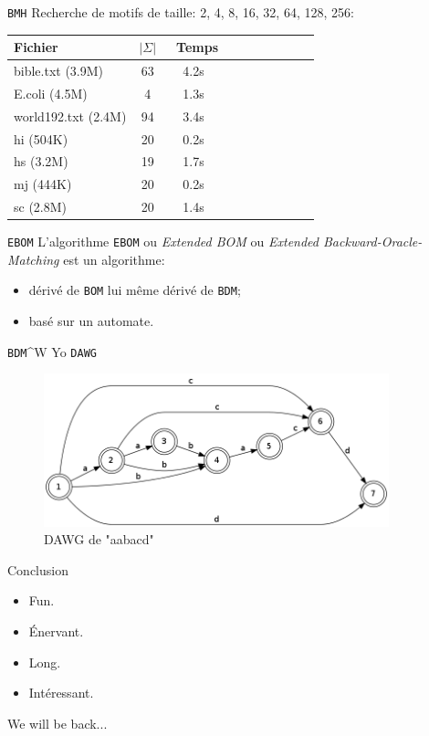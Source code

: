\documentclass[handout]{beamer}
\begin{document}
\begin{frame}{\texttt{BMH}}
  Recherche de motifs de taille: 2, 4, 8, 16, 32, 64, 128, 256:
  
  \begin{tabular}{|l|c|c|c|c|c|c|c|c|c|}
    \hline
    Fichier             & $ | \Sigma | $ & ~Temps \\
    \hline

    bible.txt (3.9M)    & 63 & 4.2s \\    
    E.coli (4.5M)       & 4  & 1.3s \\
    world192.txt (2.4M) & 94 & 3.4s \\
    hi (504K)           & 20 & 0.2s \\
    hs (3.2M)           & 19 & 1.7s \\
    mj (444K)           & 20 & 0.2s \\
    sc (2.8M)           & 20 & 1.4s \\
    \hline

  \end{tabular}
\end{frame}

\begin{frame}{\texttt{EBOM}}
  L'algorithme \texttt{EBOM} ou \emph{Extended BOM} ou \emph{Extended Backward-Oracle-Matching} est un algorithme:
  \begin{itemize}
  \item dérivé de \texttt{BOM} lui même dérivé de \texttt{BDM};
  \item basé sur un automate.
  \end{itemize}
\end{frame}

\begin{frame}{\texttt{BDM}\^{}W Yo \texttt{DAWG}}
  \begin{figure}[h]
    \centering
    \includegraphics[width=10cm]{dawg.png}
    \caption{DAWG de "aabacd"}
    \label{fig:dawg}
  \end{figure}
\end{frame}

\begin{frame}{Conclusion}
  \begin{itemize}
  \item Fun.
  \item Énervant.
  \item Long.
  \item Intéressant.
  \end{itemize}

  We will be back...
\end{frame}
\end{document}
